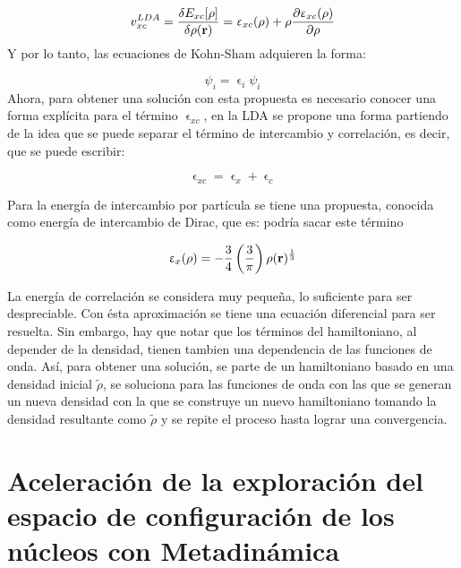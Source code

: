 \documentclass [11pt]{article}
\begin{document}
\begin{equation}
    v_{xc}^{LDA}=\frac{\delta E_{xc}[\rho]}{\delta \rho({\bf r})}=\upvarepsilon_{xc}(\rho)+\rho\frac{\partial \upvarepsilon_{xc}(\rho)}{\partial \rho}
\end{equation}
Y por lo tanto, las ecuaciones de Kohn-Sham adquieren la forma:

\begin{equation}
    [-\frac{1}{2}\nabla^2+v({\bf r})+\int \frac{\rho({\bf r'})}{|{\bf r}-{\bf r'}}d{\bf r'}+ v_{xc}^{LDA}]\psi_i=\upvarepsilon_i \psi_i
\end{equation}
Ahora, para obtener una solución con esta propuesta es necesario conocer una forma explícita para el término $\upvarepsilon_{xc}$, en la LDA se propone una forma partiendo de la idea que se puede separar el término de intercambio y correlación, es decir, que se puede escribir:

\begin{equation}
    \upvarepsilon_{xc}=\upvarepsilon_{x}+\upvarepsilon_{c}
\end{equation}

Para la energía de intercambio por partícula se tiene una propuesta, conocida como energía de intercambio de Dirac, que es:{\color{magenta} podría sacar este término}

\begin{equation}
    \upvarepsilon_{x}(\rho)=-\frac{3}{4}\left(\frac{3}{\pi}\right)\rho({\bf r})^\frac{1}{3}
\end{equation}

La energía de correlación se considera muy pequeña, lo suficiente para ser despreciable. Con ésta aproximación se tiene una ecuación diferencial para ser resuelta. Sin embargo, hay que notar que los términos del hamiltoniano, al depender de la densidad, tienen tambien una dependencia de las funciones de onda. Así, para obtener una solución, se parte de un hamiltoniano basado en una densidad inicial $\tilde\rho$, se soluciona para las funciones de onda con las que se generan un nueva densidad con la que se construye un nuevo hamiltoniano tomando la densidad resultante como $\tilde\rho$ y se repite el proceso hasta lograr una convergencia.


\section{Aceleración de la exploración del espacio de configuración de los núcleos con Metadinámica}
\end{document}
